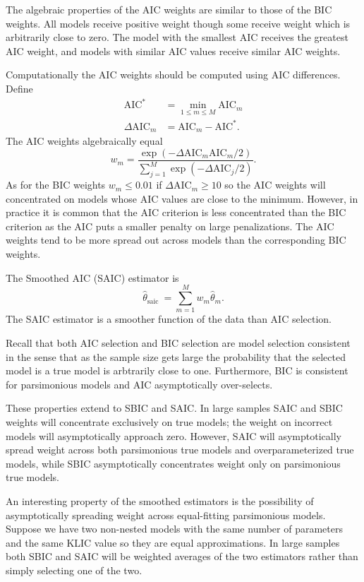 \documentclass[10pt]{article}
\begin{document}
The algebraic properties of the AIC weights are similar to those of the BIC weights. All models receive positive weight though some receive weight which is arbitrarily close to zero. The model with the smallest AIC receives the greatest AIC weight, and models with similar AIC values receive similar AIC weights.

Computationally the AIC weights should be computed using AIC differences. Define
$$
\begin{aligned}
\mathrm{AIC}^{*} &=\min _{1 \leq m \leq M} \mathrm{AIC}_{m} \\
\Delta \mathrm{AIC}_{m} &=\mathrm{AIC}_{m}-\mathrm{AIC}^{*} .
\end{aligned}
$$
The AIC weights algebraically equal
$$
w_{m}=\frac{\exp \left(-\Delta \mathrm{AIC}_{m} \mathrm{AIC}_{m} / 2\right)}{\sum_{j=1}^{M} \exp \left(-\Delta \mathrm{AIC}_{j} / 2\right)} .
$$
As for the BIC weights $w_{m} \leq 0.01$ if $\Delta \mathrm{AIC}_{m} \geq 10$ so the AIC weights will concentrated on models whose AIC values are close to the minimum. However, in practice it is common that the AIC criterion is less concentrated than the BIC criterion as the AIC puts a smaller penalty on large penalizations. The AIC weights tend to be more spread out across models than the corresponding BIC weights.

The Smoothed AIC (SAIC) estimator is
$$
\widehat{\theta}_{\text {saic }}=\sum_{m=1}^{M} w_{m} \widehat{\theta}_{m} .
$$
The SAIC estimator is a smoother function of the data than AIC selection.

Recall that both AIC selection and BIC selection are model selection consistent in the sense that as the sample size gets large the probability that the selected model is a true model is arbtrarily close to one. Furthermore, BIC is consistent for parsimonious models and AIC asymptotically over-selects.

These properties extend to SBIC and SAIC. In large samples SAIC and SBIC weights will concentrate exclusively on true models; the weight on incorrect models will asymptotically approach zero. However, SAIC will asymptotically spread weight across both parsimonious true models and overparameterized true models, while SBIC asymptotically concentrates weight only on parsimonious true models.

An interesting property of the smoothed estimators is the possibility of asymptotically spreading weight across equal-fitting parsimonious models. Suppose we have two non-nested models with the same number of parameters and the same KLIC value so they are equal approximations. In large samples both SBIC and SAIC will be weighted averages of the two estimators rather than simply selecting one of the two.
\end{document}
